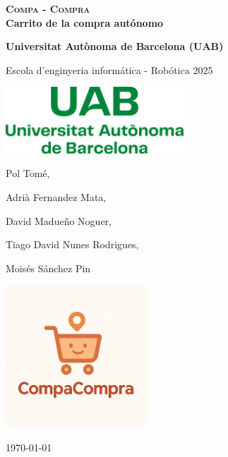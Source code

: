 \documentclass[a4paper,12pt]{article}
\begin{document}
\begin{titlepage}
    \centering
    \vspace*{2cm}

    {\Huge\bfseries \textsc{Compa - Compra} \\ Carrito de la compra autónomo  \par}

    \vspace{1.5cm}
    {\Large\bfseries Universitat Autònoma de Barcelona (UAB)
    
    Escola d'enginyeria informática - Robótica 2025 \par}

    \vspace{0.5cm}

    \includegraphics[width=0.5\textwidth]{Logo_uab.png} %

    \vspace{0.5cm}
    {\large Pol Tomé, 

    Adrià Fernandez Mata, 

    David Madueño Noguer,

    Tiago David Nunes Rodrigues, 

    Moisés Sánchez Pin
     \par}

    \vspace{2cm}
    \includegraphics[width=0.4\textwidth]{compacompra_logo.jpg} %

    \vfill
    {\Large \today}

\end{titlepage}
\end{document}
